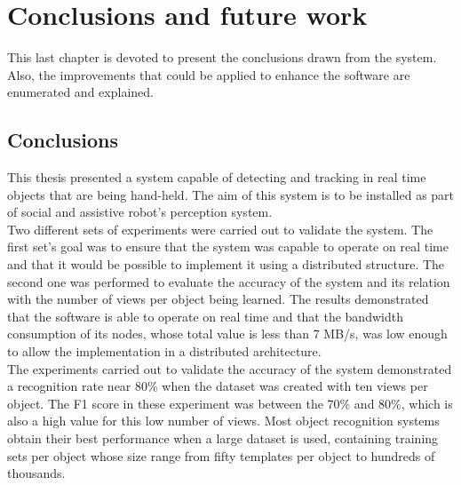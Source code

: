 \chapter{Conclusions and future work}
\label{conclusions}

This last chapter is devoted to present the conclusions drawn from the system. 
Also, the improvements that could be applied to enhance the software are enumerated and explained. 

	\section{Conclusions}

	This thesis presented a system capable of detecting and tracking in real time objects that are being hand-held. 
	The aim of this system is to be installed as part of social and assistive robot's perception system.
	\\
	Two different sets of experiments were carried out to validate the system. 
	The first set's goal was to ensure that the system was capable to operate on real time and that it would be possible to implement it using a distributed structure. 
	The second one was performed to evaluate the accuracy of the system and its relation with the number of views per object being learned. 
	The results demonstrated that the software is able to operate on real time and that the bandwidth consumption of its nodes, whose total value is less than 7 MB/s, was low enough to allow the implementation in a distributed architecture. 
	\\

	The experiments carried out to validate the accuracy of the system demonstrated a recognition rate near 80\% when the dataset was created with ten views per object. 
	The F1 score in these experiment was between the 70\% and 80\%, which is also a high value for this low number of views. 
	Most object recognition systems obtain their best performance when a large dataset is used, containing training sets per object whose size range from fifty templates per object to hundreds of thousands.
	\\


